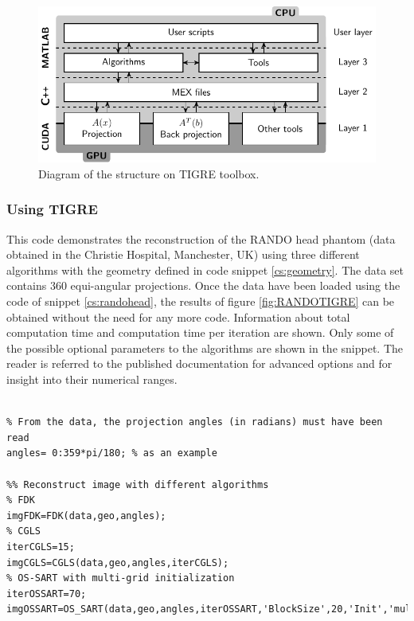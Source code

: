 \begin{figure}
\begin{center}

\includegraphics{GPUmethods/structureTIGRE-figure0.pdf} 
\end{center}

\caption[Diagram of the structure of the TIGRE toolbox]{\label{fig:structureTIGRE} Diagram of the structure on TIGRE toolbox.} 
\end{figure}

\subsubsection{Using TIGRE}
This code demonstrates the reconstruction of the RANDO head phantom (data obtained in the Christie Hospital, Manchester, UK) using three different algorithms with the geometry defined in code snippet \ref{cs:geometry}. The data set contains 360 equi-angular projections. Once the data have been loaded using the code of snippet \ref{cs:randohead}, the results of figure \ref{fig:RANDOTIGRE} can be obtained without the need for any more code. Information about total computation time and computation time per iteration are shown. Only some of the possible optional parameters to the algorithms are shown in the snippet. The reader is referred to the published documentation for advanced options and for insight into their numerical ranges. 

\begin{lstlisting}[style=Matlab-editor,
basicstyle=\scriptsize,
caption= RANDO head data reconstruction,
label={cs:randohead},
frame = single
]
% Define Geometry & load data

% From the data, the projection angles (in radians) must have been read
angles= 0:359*pi/180; % as an example 

%% Reconstruct image with different algorithms
% FDK
imgFDK=FDK(data,geo,angles);
% CGLS
iterCGLS=15;
imgCGLS=CGLS(data,geo,angles,iterCGLS);
% OS-SART with multi-grid initialization
iterOSSART=70; 
imgOSSART=OS_SART(data,geo,angles,iterOSSART,'BlockSize',20,'Init','multigrid');

\end{lstlisting}





